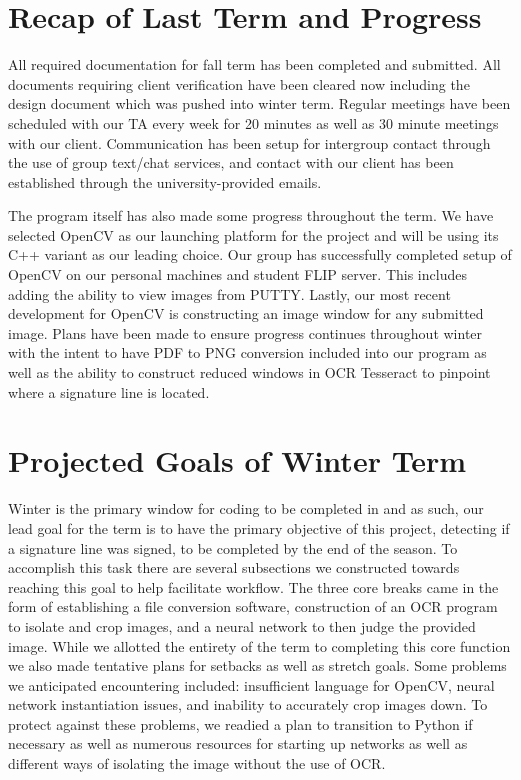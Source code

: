 \documentclass[onecolumn, draftclsnofoot,10pt, compsoc]{IEEEtran}
\begin{document}
\section{Recap of Last Term and Progress}
All required documentation for fall term has been completed and submitted. All documents requiring client verification have been cleared now including the design document which was pushed into winter term. Regular meetings have been scheduled with our TA every week for 20 minutes as well as 30 minute meetings with our client. Communication has been setup for intergroup contact through the use of group text/chat services, and contact with our client has been established through the university-provided emails.

The program itself has also made some progress throughout the term. We have selected OpenCV as our launching platform for the project and will be using its C++ variant as our leading choice. Our group has successfully completed setup of OpenCV on our personal machines and student FLIP server. This includes adding the ability to view images from PUTTY. Lastly, our most recent development for OpenCV is constructing an image window for any submitted image. Plans have been made to ensure progress continues throughout winter with the intent to have PDF to PNG conversion included into our program as well as the ability to construct reduced windows in OCR Tesseract to pinpoint where a signature line is located.

\section{Projected Goals of Winter Term}
Winter is the primary window for coding to be completed in and as such, our lead goal for the term is to have the primary objective of this project, detecting if a signature line was signed, to be completed by the end of the season. To accomplish this task there are several subsections we constructed towards reaching this goal to help facilitate workflow. The three core breaks came in the form of establishing a file conversion software, construction of an OCR program to isolate and crop images, and a neural network to then judge the provided image. While we allotted the entirety of the term to completing this core function we also made tentative plans for setbacks as well as stretch goals. Some problems we anticipated encountering included: insufficient language for OpenCV, neural network instantiation issues, and inability to accurately crop images down. To protect against these problems, we readied a plan to transition to Python if necessary as well as numerous resources for starting up networks as well as different ways of isolating the image without the use of OCR.
\end{document}
